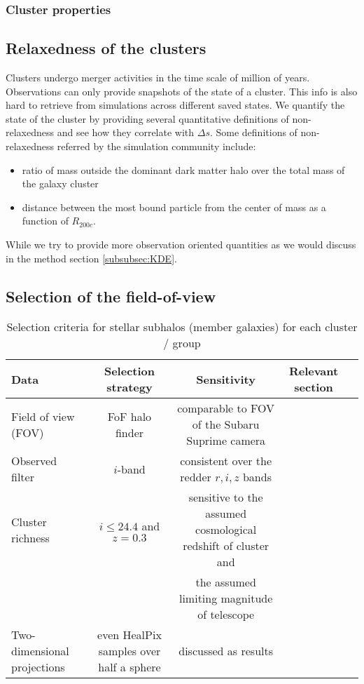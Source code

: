 
\subsubsection{Cluster properties}
\label{subsubsec:cluster_properties}

\subsection{Relaxedness of the clusters}

Clusters undergo merger activities in the time scale of million of years. 
Observations can only provide snapshots of the state of a cluster. 
This info is also hard to retrieve from simulations across different saved
states.
We quantify the state of the cluster by providing several quantitative
definitions of non-relaxedness and see how they correlate with $\Delta s$.
Some definitions of non-relaxedness referred by the simulation community
include:
\begin{itemize}
	\item ratio of mass outside the dominant dark matter halo over the total mass
		of the galaxy cluster 
	\item distance between the most bound particle from the center of mass as a
		function of $R_{200c}$.
\end{itemize}
While we try to provide more observation oriented quantities as we would
discuss in the method section \ref{subsubsec:KDE}. 


\subsection{Selection of the field-of-view}
\label{sec:FOV}

\begin{table*}
\begin{center}
\begin{minipage}{180mm} 
	\caption{ Selection criteria for stellar subhalos (member galaxies) for each
		cluster / group 
\label{tab:member_galaxy_selections}} 
	\begin{tabular}{@{}lcccc@{}}
\hline 
Data &  Selection strategy  & Sensitivity & Relevant section  \\ \hline
Field of view (FOV) & FoF halo finder& comparable to FOV of the Subaru
Suprime camera &   \\ 
Observed filter & $i$-band & consistent over the redder $r, i, z$ bands &   \\ 
Cluster richness  & $i \leq 24.4$ and $z = 0.3$  & sensitive to
the assumed cosmological redshift of cluster and &    \\ 
& & the assumed limiting magnitude of telescope &   \\
Two-dimensional projections & even HealPix samples over half a sphere &
discussed as results  & \\  
\hline
\end{tabular} 
\label{tab:selection_criteria} 
\footnotesize{
}
\end{minipage}
\end{center} 
\end{table*}

